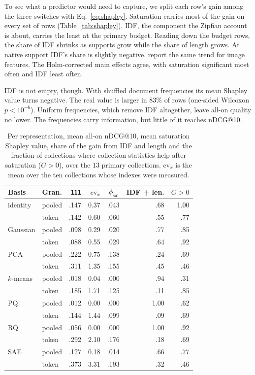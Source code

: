 \documentclass[11pt]{article}
\begin{document}
To see what a predictor would need to capture, we split each row's gain among the three
switches with Eq.~\eqref{eq:shapley}. Saturation carries most of the gain on every set of
rows (Table~\ref{tab:shapley}). IDF, the component the Zipfian account is
about, carries the least at the primary budget. Reading down the budget rows, the share of
IDF shrinks as supports grow while the share of length grows. At native support IDF's
share is slightly negative. \citet{han2026bm25v} report the same trend for image
features. The Holm-corrected main effects agree, with saturation significant most often
and IDF least often.

IDF is not empty, though. With shuffled document frequencies its mean Shapley value turns
negative. The real value is larger in $83\%$ of rows (one-sided Wilcoxon
$p < 10^{-6}$). Uniform frequencies, which remove IDF altogether, leave all-on quality no
lower. The frequencies carry information, but little of it reaches nDCG@10.

\begin{table}[t]
\centering
\small
\setlength{\tabcolsep}{3.5pt}
\begin{tabular}{@{}llrrrrr@{}}
\toprule
Basis & Gran. & \texttt{111} & $\mathrm{cv}_x$ & $\phi_{\mathrm{sat}}$ & IDF + len. & $G > 0$ \\
\midrule
identity & pooled & .147 & 0.37 & .043 & .68 & 1.00 \\
 & token & .142 & 0.60 & .060 & .55 & .77 \\
Gaussian & pooled & .098 & 0.29 & .020 & .77 & .85 \\
 & token & .088 & 0.55 & .029 & .64 & .92 \\
PCA & pooled & .222 & 0.75 & .138 & .24 & .69 \\
 & token & .311 & 1.35 & .155 & .45 & .46 \\
$k$-means & pooled & .018 & 0.04 & .000 & .94 & .31 \\
 & token & .185 & 1.71 & .125 & .11 & .85 \\
PQ & pooled & .012 & 0.00 & .000 & 1.00 & .62 \\
 & token & .144 & 1.44 & .099 & .09 & .69 \\
RQ & pooled & .056 & 0.00 & .000 & 1.00 & .92 \\
 & token & .292 & 2.10 & .176 & .18 & .69 \\
SAE & pooled & .127 & 0.18 & .014 & .66 & .77 \\
 & token & .373 & 3.31 & .193 & .32 & .46 \\
\bottomrule
\end{tabular}
\caption{Per representation, mean all-on nDCG@10, mean saturation Shapley value, share of
the gain from IDF and length and the fraction of collections where collection statistics
help after saturation ($G > 0$), over the 13 primary collections. $\mathrm{cv}_x$ is the
mean over the ten collections whose indexes were measured.}
\label{tab:bases}
\end{table}
\end{document}
